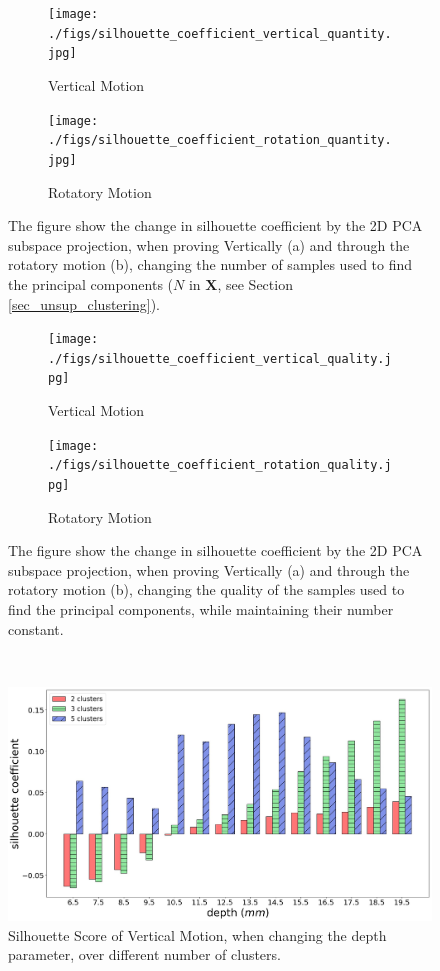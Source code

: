 \documentclass[]{interact}
\theoremstyle{plain}%
\theoremstyle{definition}
\theoremstyle{remark}
\begin{document}
\begin{minipage}{\textwidth}
	\begin{figure}[H]
		\centering
		\begin{subfigure}[b]{.48\textwidth}
			\texttt{[image: ./figs/silhouette\_coefficient\_vertical\_quantity.jpg]}
			\caption{Vertical Motion}
			\label{silhouette_quantity:vertical}
		\end{subfigure}
		\begin{subfigure}[b]{.48\textwidth}
			\texttt{[image: ./figs/silhouette\_coefficient\_rotation\_quantity.jpg]}
			\caption{Rotatory Motion}
			\label{silhouette_quantity:Rotation}
		\end{subfigure}
		\caption{The figure show the change in silhouette coefficient by the 2D PCA subspace projection, when proving Vertically (a) and through the rotatory motion (b), changing the number of samples used to find the principal components ($N$ in $\mathbf{X}$, see Section \ref{sec_unsup_clustering}). }
		\label{silhouette_quantity}
	\end{figure}
	\begin{figure}[H]
		\centering
		\begin{subfigure}[b]{.48\textwidth}
			\texttt{[image: ./figs/silhouette\_coefficient\_vertical\_quality.jpg]}
			\caption{Vertical Motion}
			\label{silhouette_quality:vertical}
		\end{subfigure}
		\begin{subfigure}[b]{.48\textwidth}
			\texttt{[image: ./figs/silhouette\_coefficient\_rotation\_quality.jpg]}
			\caption{Rotatory Motion}
			\label{silhouette_quality:Rotation}
		\end{subfigure}
		\caption{The figure show the change in silhouette coefficient by the 2D PCA subspace projection, when proving Vertically (a) and through the rotatory motion (b), changing the quality of the samples used to find the principal components, while maintaining their number constant. }
		\label{silhouette_quality}
	\end{figure}
	\hfill\\
\end{minipage}


\begin{figure}[]
	\centering
	\includegraphics[width=.8\textwidth]{./figs/bar_clst_num_change}
	\caption{Silhouette Score of Vertical Motion, when changing the depth parameter, over different number of clusters.}
	\label{clst_number}
\end{figure}
\end{document}
